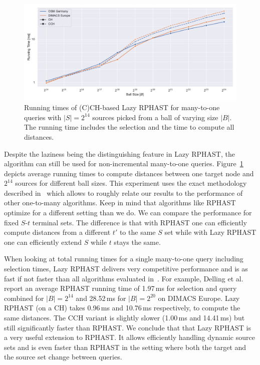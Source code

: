 \documentclass[manuscript,review]{acmart}
\begin{document}
\begin{figure}
\centering
\includegraphics[width=\linewidth]{fig/lazy_rphast_many_to_one_both.pdf}
\caption{
Running times of (C)CH-based Lazy RPHAST for many-to-one queries with $|S| = 2^{14}$ sources picked from a ball of varying size $|B|$.
The running time includes the selection and the time to compute all distances.
}\label{fig:many_to_one}
\end{figure}

Despite the laziness being the distinguishing feature in Lazy RPHAST, the algorithm can still be used for non-incremental many-to-one queries.
Figure~\ref{fig:many_to_one} depicts average running times to compute distances between one target node and $2^{14}$ sources for different ball sizes.
This experiment uses the exact methodology described in~\cite{delling_et_al:OASIcs:2011:3266} which allows to roughly relate our results to the performance of other one-to-many algorithms.
Keep in mind that algorithms like RPHAST optimize for a different setting than we do.
We can compare the performance for fixed $S$-$t$ terminal sets.
The difference is that with RPHAST one can efficiently compute distances from a different $t'$ to the same $S$ set while with Lazy RPHAST one can efficiently extend $S$ while $t$ stays the same.

When looking at total running times for a single many-to-one query including selection times, Lazy RPHAST delivers very competitive performance and is as fast if not faster than all algorithms evaluated in~\cite{delling_et_al:OASIcs:2011:3266}.
For example, Delling et al. report an average RPHAST running time of 1.97\,ms for selection and query combined for $|B| = 2^{14}$ and 28.52\,ms for $|B| = 2^{20}$ on DIMACS Europe.
Lazy RPHAST (on a CH) takes 0.96\,ms and 10.76\,ms respectively, to compute the same distances.
The CCH variant is slightly slower (1.00\,ms and 14.41\,ms) but still significantly faster than RPHAST.
We conclude that that Lazy RPHAST is a very useful extension to RPHAST.
It allows efficiently handling dynamic source sets and is even faster than RPHAST in the setting where both the target and the source set change between queries.
\end{document}
